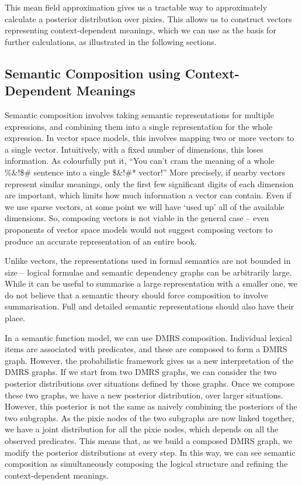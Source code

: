 \documentclass[a4paper,11pt]{article}
\begin{document}
This mean field approximation
gives us a tractable way to approximately calculate a posterior distribution over pixies.
This allows us to construct vectors representing context-dependent meanings,
which we can use as the basis for further calculations,
as illustrated in the following sections.


\subsection{Semantic Composition using Context-Dependent Meanings}
\label{sec:comp}

Semantic composition involves taking semantic representations for multiple expressions,
and combining them into a single representation for the whole expression.
In vector space models, this involves mapping two or more vectors to a single vector.
Intuitively, with a fixed number of dimensions, this loses information.
As \citet{mooney2014cram} colourfully put it,
``You can't cram the meaning of a whole  
\%\&!\$\# sentence into a single \$\&!\#* vector!''
More precisely, if nearby vectors represent similar meanings,
only the first few significant digits of each dimension are important,
which limits how much information a vector can contain.
Even if we use sparse vectors,
at some point we will have `used up' all of the available dimensions.
So, composing vectors is not viable in the general case --
even proponents of vector space models
would not suggest composing vectors
to produce an accurate representation of an entire book.

Unlike vectors, the representations used in formal semantics are not bounded in size --
logical formulae and semantic dependency graphs can be arbitrarily large.
While it can be useful to summarise a large representation with a smaller one,
we do not believe that a semantic theory should force composition to involve summarisation.
Full and detailed semantic representations should also have their place.

In a semantic function model,
we can use DMRS composition.
Individual lexical items are associated with predicates,
and these are composed to form a DMRS graph.
However, the probabilistic framework gives us a new interpretation of the DMRS graphs.
If we start from two DMRS graphs,
we can consider the two posterior distributions over situations defined by those graphs.
Once we compose these two graphs,
we have a new posterior distribution, over larger situations.
However, this posterior is not the same as naively combining the posteriors of the two subgraphs.
As the pixie nodes of the two subgraphs are now linked together,
we have a joint distribution for all the pixie nodes,
which depends on all the observed predicates.
This means that, as we build a composed DMRS graph,
we modify the posterior distributions at every step.
In this way, we can see semantic composition
as simultaneously composing the logical structure
and refining the context-dependent meanings.
\end{document}
